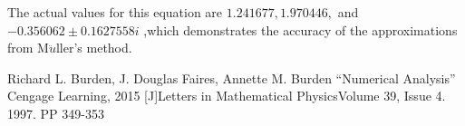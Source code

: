 \documentclass{article}
\begin{document}
The actual values for this equation are $1.241677,1.970446,$ and $-0.356062 \pm 0.1627558i$ ,which demonstrates the accuracy of the approximations from M$\ddot u$ller's method.

\newpage
\clearpage
{}
{}
\begin{thebibliography}{99}  
Richard L. Burden, J. Douglas Faires, Annette M. Burden “Numerical Analysis” Cengage Learning, 2015
[J]Letters in Mathematical PhysicsVolume 39, Issue 4. 1997. PP 349-353 
\end{thebibliography}
\end{document}
